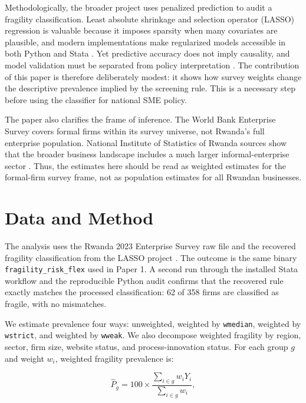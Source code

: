 \documentclass[man,12pt,floatsintext]{apa7}
\let\citep\parencite
\begin{document}
Methodologically, the broader project uses penalized prediction to audit a fragility classification. Least absolute shrinkage and selection operator (LASSO) regression is valuable because it imposes sparsity when many covariates are plausible, and modern implementations make regularized models accessible in both Python and Stata \citep{ahrens2020lassopack, friedman2010regularization, hastie2015sparsity, tibshirani1996regression}. Yet predictive accuracy does not imply causality, and model validation must be separated from policy interpretation \citep{arlot2010crossvalidation, athey2019machine, kleinberg2018human, mullainathan2017machine, shmueli2010explain}. The contribution of this paper is therefore deliberately modest: it shows how survey weights change the descriptive prevalence implied by the screening rule. This is a necessary step before using the classifier for national SME policy.

The paper also clarifies the frame of inference. The World Bank Enterprise Survey covers formal firms within its survey universe, not Rwanda's full enterprise population. National Institute of Statistics of Rwanda sources show that the broader business landscape includes a much larger informal-enterprise sector \citep{nisr2024establishment, nisr2025ibes}. Thus, the estimates here should be read as weighted estimates for the formal-firm survey frame, not as population estimates for all Rwandan businesses.

\section{Data and Method}

The analysis uses the Rwanda 2023 Enterprise Survey raw file and the recovered fragility classification from the LASSO project \citep{worldbank2025rwanda}. The outcome is the same binary \texttt{fragility\_risk\_flex} used in Paper 1. A second run through the installed Stata workflow and the reproducible Python audit confirms that the recovered rule exactly matches the processed classification: 62 of 358 firms are classified as fragile, with no mismatches.

We estimate prevalence four ways: unweighted, weighted by \texttt{wmedian}, weighted by \texttt{wstrict}, and weighted by \texttt{wweak}. We also decompose weighted fragility by region, sector, firm size, website status, and process-innovation status. For each group $g$ and weight $w_i$, weighted fragility prevalence is:

\[
\hat{P}_g = 100 \times \frac{\sum_{i \in g} w_i Y_i}{\sum_{i \in g} w_i},
\]
\end{document}
